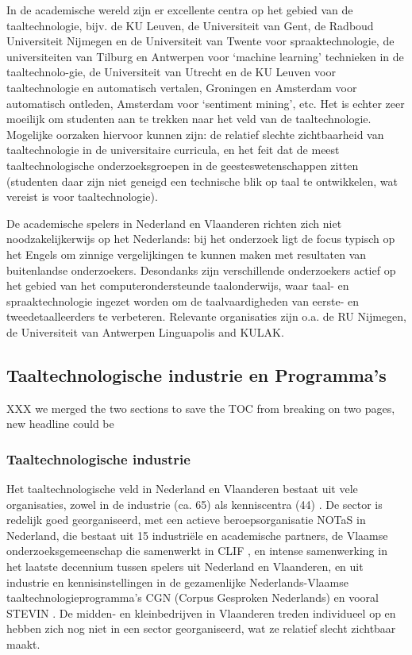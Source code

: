 \documentclass[]{../../metanetpaper}
\begin{document}
\begin{multicols}{2}
    In de academische wereld zijn er excellente centra op het gebied van de taaltechnologie, bijv. de KU Leuven, de Universiteit van Gent, de Radboud Universiteit Nijmegen en de Universiteit van Twente voor spraaktechnologie, de universiteiten van Tilburg en Antwerpen voor `machine learning' technieken in de taaltechnolo-gie, de Universiteit van Utrecht en de KU Leuven voor taaltechnologie en automatisch vertalen, Groningen en Amsterdam voor automatisch ontleden, Amsterdam voor `sentiment mining', etc. Het is echter zeer moeilijk om studenten aan te trekken naar het veld van de taaltechnologie. Mogelijke oorzaken hiervoor kunnen zijn: de relatief slechte zichtbaarheid van taaltechnologie in de universitaire curricula, en het feit dat de meest taaltechnologische onderzoeksgroepen in de geesteswetenschappen zitten (studenten daar zijn niet geneigd een technische blik op taal te ontwikkelen, wat vereist is voor taaltechnologie).

    De academische spelers in Nederland en Vlaanderen richten zich niet noodzakelijkerwijs op het Nederlands: bij het onderzoek ligt de focus typisch op het Engels om zinnige vergelijkingen te kunnen maken met resultaten van buitenlandse onderzoekers. Desondanks zijn verschillende onderzoekers actief op het gebied van het computerondersteunde taalonderwijs, waar taal- en spraaktechnologie ingezet worden om de taalvaardigheden van eerste- en tweedetaalleerders te verbeteren. Relevante organisaties zijn o.a. de RU Nijmegen, de Universiteit van Antwerpen Linguapolis and KULAK.
    
 \subsection{Taaltechnologische industrie en Programma's}
XXX we merged the two sections to save the TOC from breaking on two pages, new headline could be 

\subsubsection{Taaltechnologische industrie}

 Het taaltechnologische veld in Nederland en Vlaanderen bestaat uit vele organisaties, zowel in de industrie (ca. 65) als kenniscentra (44) \cite{Orgs}.  De sector is redelijk goed georganiseerd, met een actieve beroepsorganisatie NOTaS \cite{NOTAS} in Nederland, die bestaat uit 15 industri{\"e}le en academische partners, de Vlaamse onderzoeksgemeenschap die samenwerkt in CLIF \cite{CLIF}, en intense samenwerking in het laatste decennium tussen spelers uit Nederland en Vlaanderen, en uit industrie en kennisinstellingen in de gezamenlijke Nederlands-Vlaamse taaltechnologieprogramma's CGN (Corpus Gesproken Nederlands) \cite{CGN} en vooral STEVIN \cite{STEVIN}. De midden- en kleinbedrijven in Vlaanderen treden individueel op en hebben zich nog niet in een sector georganiseerd, wat ze relatief slecht zichtbaar maakt.


\end{multicols}
\end{document}
